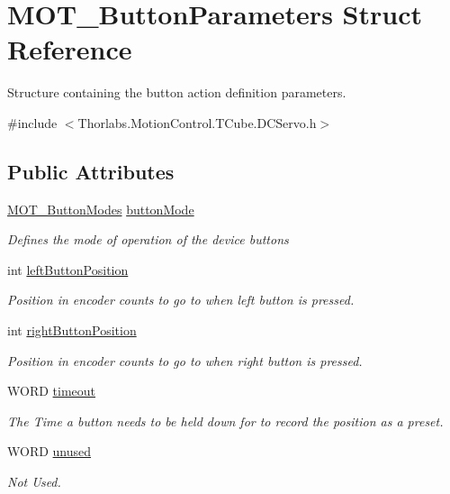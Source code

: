 \hypertarget{struct_m_o_t___button_parameters}{}\section{M\+O\+T\+\_\+\+Button\+Parameters Struct Reference}
\label{struct_m_o_t___button_parameters}


Structure containing the button action definition parameters.  




{\ttfamily \#include $<$Thorlabs.\+Motion\+Control.\+T\+Cube.\+D\+C\+Servo.\+h$>$}

\subsection*{Public Attributes}
\begin{DoxyCompactItemize}
\item 
\hyperlink{group___common_ga7cccb4c592f8aa2f869b5cd9f0b0e7f9}{M\+O\+T\+\_\+\+Button\+Modes} \hyperlink{struct_m_o_t___button_parameters_ad46c7e9e1f474b4cb8b40207cf54274f}{button\+Mode}
\begin{DoxyCompactList}\small\item\em Defines the mode of operation of the device buttons \end{DoxyCompactList}\item 
int \hyperlink{struct_m_o_t___button_parameters_ab2056c54cd93d585a85a7d3356559545}{left\+Button\+Position}
\begin{DoxyCompactList}\small\item\em Position in encoder counts to go to when left button is pressed. \end{DoxyCompactList}\item 
int \hyperlink{struct_m_o_t___button_parameters_aaa6a82b077940752de850c93710b9818}{right\+Button\+Position}
\begin{DoxyCompactList}\small\item\em Position in encoder counts to go to when right button is pressed. \end{DoxyCompactList}\item 
W\+O\+RD \hyperlink{struct_m_o_t___button_parameters_a6cb672c588b29986cd0be90c2bedea40}{timeout}
\begin{DoxyCompactList}\small\item\em The Time a button needs to be held down for to record the position as a preset. \end{DoxyCompactList}\item 
W\+O\+RD \hyperlink{struct_m_o_t___button_parameters_aed9c9ca1156348e6095577ea4f803cb8}{unused}
\begin{DoxyCompactList}\small\item\em Not Used. \end{DoxyCompactList}\end{DoxyCompactItemize}


